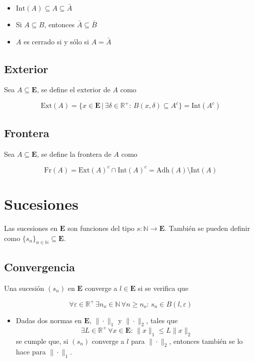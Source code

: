 \begin{itemize}
    \item $\mathrm{Int}(A)\subseteq A\subseteq \bar{A}$
    \item Si $A\subseteq B$, entonces $\bar{A}\subseteq\bar{B}$
    \item $A$ es cerrado si y sólo si $A=\bar{A}$
\end{itemize}

\subsection{Exterior}

Sea $A\subseteq\mathbf{E}$, se define el exterior de $A$ como

\[\mathrm{Ext}(A) = \{x\in\mathbf{E}\,|\,
\exists\delta\in\mathbb{R}^+:\,B(x,\delta)\subseteq A^c\}=
\mathrm{Int}(A^c)\]

\subsection{Frontera}

Sea $A\subseteq\mathbf{E}$, se define la frontera de $A$ como

\[\mathrm{Fr}(A)=\mathrm{Ext}(A)^c\cap\mathrm{Int}(A)^c
=\mathrm{Adh}(A)\setminus\mathrm{Int}(A)\]

\section{Sucesiones}

Las sucesiones en $\mathbf{E}$ son funciones del tipo $s:\mathbb{N}\to\mathbf{E}$. También se pueden definir como $\{s_n\}_{n\in\mathbb{N}}\subseteq\mathbf{E}$.

\subsection{Convergencia}

Una sucesión $(s_n)$ en $\mathbf{E}$ converge a $l\in\mathbf{E}$ si se verifica que

\[\forall\varepsilon\in\mathbb{R}^+\,
\exists n_o\in\mathbb{N}\, \forall n\geq n_o:\,
s_n\in B(l, \varepsilon)\]

\begin{itemize}
\item Dadas dos normas en $\mathbf{E}$, $\|\cdot\|_1$ y $\|\cdot\|_2$, tales que
\[\exists L\in\mathbb{R}^+\,\forall x\in\mathbf{E}:\,
\|x\|_1\leq L\|x\|_2\]
se cumple que, si $(s_n)$ converge a $l$ para $\|\cdot\|_2$, entonces también se lo hace para $\|\cdot\|_1$.
\end{itemize}

